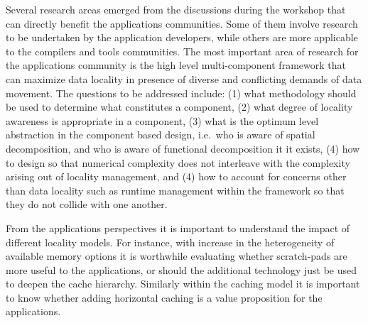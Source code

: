Several research areas emerged from the discussions during the
workshop that can directly benefit the applications communities. Some
of them involve research to be undertaken by the application
developers, while others are more applicable to the compilers and
tools communities. The most important area of research for the
applications community is the high level multi-component framework
that can maximize data locality in presence of diverse and conflicting
demands of data movement. The questions to be addressed include: (1)
what methodology should be used to determine what constitutes a
component, (2) what degree of locality awareness is appropriate in a
component, (3) what is the optimum level abstraction in the component
based design, i.e.\ who is aware of spatial decomposition, and who is
aware of functional decomposition it it exists, (4) how to design so that
numerical complexity does not interleave with the complexity arising
out of locality management, and (4) how to account for concerns other
than data locality such as runtime management within the framework so
that they do not collide with one another. 

From the applications perspectives it is important to understand the
impact of different locality models. For instance, with increase in
the heterogeneity of available memory options it is worthwhile
evaluating whether scratch-pads are more useful to the applications,
or should the additional technology just be used to deepen the cache
hierarchy. Similarly within the caching model it is important to know
whether adding horizontal caching is a value proposition for the
applications. 